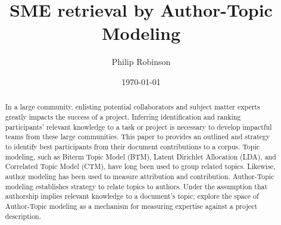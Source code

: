 \documentclass{article}
\title{SME retrieval by Author-Topic Modeling}
\date{\today}
\author{Philip Robinson}
\affil{NASA: Jet Propoultion Labratory}
\begin{document}
\maketitle

\begin{abstract}
  In a large community, enlisting potential collaborators and subject matter experts
  greatly impacts the success of a project. Inferring identification and ranking
  participants' relevant knowledge to a task or project is necessary to develop
  impactful teams from these large communities\cite{Minto2007}. This
  paper to provides an outlined and strategy to identify best participants from their
  document contributions to a corpus. Topic modeling, such as Biterm Topic Model (BTM)\cite{Yan2013,Chen2015}, Latent Dirichlet Allocation (LDA),
  and Correlated Topic Model (CTM), have long been used to group related topics\cite{Alghamdi2015}. Likewise,
  author modeling has been used to measure attribution\cite{Rexha2018} and
  contribution\cite{AldebeiHJ016}. Author-Topic modeling establishes strategy to
  relate topics to authors\cite{Rosen-Zvi2004}. Under the assumption that
  authorship implies relevant knowledge to a document's topic; explore
  the space of Author-Topic modeling as a mechanism for measuring expertise against a
  project description.
\end{abstract}

\end{document}
